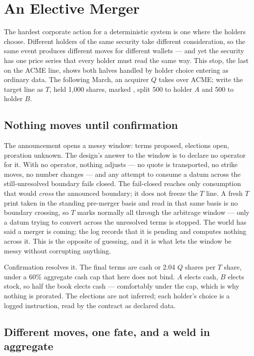 \section{An Elective Merger}\label{sec:tour-merger}

The hardest corporate action for a deterministic system is one where the holders
choose. Different holders of the same security take different consideration, so the
same event produces different moves for different wallets --- and yet the security has
one price series that every holder must read the same way. This stop, the last on the
ACME line, shows both halves handled by holder choice entering as ordinary data. The
following March, an acquirer $Q$ takes over ACME; write the target line as $T$, held
1{,}000 shares, marked , split 500 to holder $A$ and 500 to holder $B$.

\subsection{Nothing moves until confirmation}

The announcement opens a messy window: terms proposed, elections open, proration
unknown. The design's answer to the window is to declare no operator for it. With no
operator, nothing adjusts --- no quote is transported, no strike moves, no number
changes --- and any attempt to consume a datum across the still-unresolved boundary
fails closed. The fail-closed reaches only consumption that would \emph{cross} the
announced boundary; it does not freeze the $T$ line. A fresh $T$ print taken in the
standing pre-merger basis and read in that same basis is no boundary crossing, so $T$
marks normally all through the arbitrage window --- only a datum trying to convert across
the unresolved terms is stopped. The world has said a merger is coming; the log records
that it is pending and computes nothing across it. This is the opposite of guessing, and
it is what lets the window be messy without corrupting anything.

Confirmation resolves it. The final terms are  cash or 2.04 $Q$ shares per
$T$ share, under a 60\% aggregate cash cap that here does not bind. $A$ elects cash,
$B$ elects stock, so half the book elects cash --- comfortably under the cap, which is
why nothing is prorated. The elections are not inferred; each holder's choice is a logged
instruction, read by the contract as declared data.

\subsection{Different moves, one fate, and a weld in aggregate}

